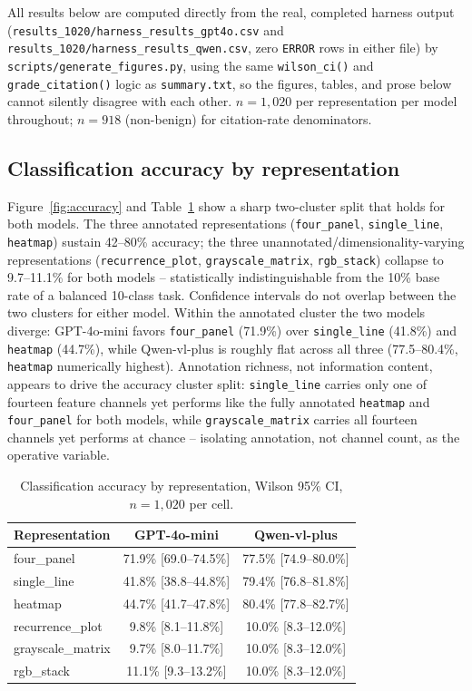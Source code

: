 \documentclass[twocolumn]{svjour3}
\begin{document}
All results below are computed directly from the real, completed harness output
(\texttt{results\_1020/harness\_results\_gpt4o.csv} and
\texttt{results\_1020/harness\_results\_qwen.csv}, zero \texttt{ERROR} rows in either file) by
\texttt{scripts/generate\_figures.py}, using the same \texttt{wilson\_ci()} and
\texttt{grade\_citation()} logic as \texttt{summary.txt}, so the figures, tables, and prose below
cannot silently disagree with each other. $n=1{,}020$ per representation per model throughout;
$n=918$ (non-benign) for citation-rate denominators.

\subsection{Classification accuracy by representation}

Figure~\ref{fig:accuracy} and Table~\ref{tab:accuracy} show a sharp two-cluster split that holds for
both models. The three annotated representations (\texttt{four\_panel}, \texttt{single\_line},
\texttt{heatmap}) sustain 42--80\% accuracy; the three unannotated/dimensionality-varying
representations (\texttt{recurrence\_plot}, \texttt{grayscale\_matrix}, \texttt{rgb\_stack}) collapse
to 9.7--11.1\% for both models -- statistically indistinguishable from the 10\% base rate of a
balanced 10-class task. Confidence intervals do not overlap between the two clusters for either
model. Within the annotated cluster the two models diverge: GPT-4o-mini favors \texttt{four\_panel}
(71.9\%) over \texttt{single\_line} (41.8\%) and \texttt{heatmap} (44.7\%), while Qwen-vl-plus is
roughly flat across all three (77.5--80.4\%, \texttt{heatmap} numerically highest). Annotation
richness, not information content, appears to drive the accuracy cluster split: \texttt{single\_line}
carries only one of fourteen feature channels yet performs like the fully annotated \texttt{heatmap}
and \texttt{four\_panel} for both models, while \texttt{grayscale\_matrix} carries all fourteen
channels yet performs at chance -- isolating annotation, not channel count, as the operative variable.

\begin{table}[t]
\centering
\caption{Classification accuracy by representation, Wilson 95\% CI, $n=1{,}020$ per cell.}
\label{tab:accuracy}
\begin{tabular}{lcc}
\toprule
Representation & GPT-4o-mini & Qwen-vl-plus \\
\midrule
four\_panel        & 71.9\% [69.0--74.5\%] & 77.5\% [74.9--80.0\%] \\
single\_line        & 41.8\% [38.8--44.8\%] & 79.4\% [76.8--81.8\%] \\
heatmap             & 44.7\% [41.7--47.8\%] & 80.4\% [77.8--82.7\%] \\
recurrence\_plot    & 9.8\% [8.1--11.8\%]   & 10.0\% [8.3--12.0\%]  \\
grayscale\_matrix   & 9.7\% [8.0--11.7\%]   & 10.0\% [8.3--12.0\%]  \\
rgb\_stack          & 11.1\% [9.3--13.2\%]  & 10.0\% [8.3--12.0\%]  \\
\bottomrule
\end{tabular}
\end{table}
\end{document}
